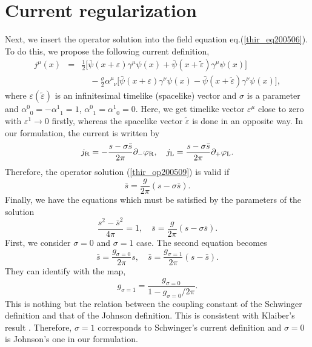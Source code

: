 \documentclass[a4paper,fleqn]{article}
\begin{document}
\section{Current regularization}
Next, we insert the operator solution into the field equation 
eq.(\ref{thir_eq200506}).
To do this, we propose the following current definition,
\begin{eqnarray}
j^\mu (x) &=& \frac{1}{2} \biggl[ \bar{\psi}(x+\varepsilon) \gamma^\mu \psi(x)
       + \bar{\psi}(x+\widetilde\varepsilon) \gamma^\mu \psi(x) \biggr] \nonumber\\
      & & \quad
       - \frac{\sigma}{2} \alpha^\mu_{\;\;\nu} \biggl[ \bar{\psi}(x+\varepsilon) \gamma^\nu \psi(x)
       - \bar{\psi}(x+\widetilde\varepsilon) \gamma^\nu \psi(x) \biggr],
\end{eqnarray}
where $\varepsilon(\widetilde\varepsilon)$ is an infinitesimal timelike (spacelike) vector and
$\sigma$ is a parameter and $\alpha^0_{\;\;0} =- \alpha^1_{\;\;1}=1$, 
$\alpha^0_{\;\;1}=\alpha^1_{\;\;0}=0$. 
Here, we get timelike vector $\varepsilon^\mu$ close to zero 
with $\varepsilon^1 \rightarrow 0$ firstly,
whereas the spacelike vector $\widetilde\varepsilon$ is done in an opposite way.
In our formulation, the current is written by
\begin{equation}
j_{\rm R} = - \frac{s - \sigma \bar{s}}{2 \pi} \partial_- \varphi_{\rm R}, \quad
j_{\rm L} = \frac{s - \sigma \bar{s}}{2 \pi} \partial_+ \varphi_{\rm L}.
\end{equation}
Therefore, the operator solution (\ref{thir_op200509}) is valid if
\begin{equation}
\bar{s} = \frac{g}{2 \pi}(s - \sigma \bar{s}).
\end{equation}
Finally, we have the equations which must be satisfied by the parameters of the solution
\begin{equation}
\frac{s^2 - \bar{s}^2}{4 \pi} = 1, \quad \bar{s} = \frac{g}{2 \pi}(s - \sigma \bar{s}).
\end{equation}
First, we consider $\sigma=0$ and $\sigma=1$ case. The second equation becomes
\begin{equation}
\bar{s} = \frac{g_{\sigma=0}}{2 \pi} s, \quad \bar{s} = \frac{g_{\sigma=1}}{2 \pi}(s - \bar{s}) .
\end{equation}
They can identify with the map,
\begin{equation}
g_{\sigma=1} = \frac{g_{\sigma=0}}{1- g_{\sigma=0}/ 2 \pi} .
\end{equation}
This is nothing but the relation between the coupling constant of the Schwinger
definition and that of the Johnson definition. This is consistent with 
Klaiber's result \cite{kla67}. 
Therefore, $\sigma=1$ corresponds to  Schwinger's current definition and
$\sigma=0$ is  Johnson's one in our formulation.
\end{document}

